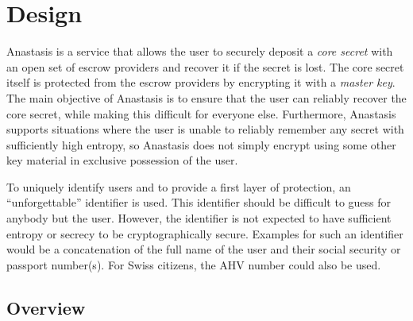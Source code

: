 \section{Design} \label{chap:design}

Anastasis is a service that allows the user to securely deposit a {\em core
secret} with an open set of escrow providers and recover it if the
secret is lost. The core secret itself is protected from the escrow
providers by encrypting it with a {\em master key}. The main objective of
Anastasis is to ensure that the user can reliably recover the core
secret, while making this difficult for everyone else. Furthermore, Anastasis
supports situations where the user is unable to reliably remember any secret
with sufficiently high entropy, so Anastasis does not simply encrypt using some
other key material in exclusive possession of the user.

To uniquely identify users and to provide a first layer of protection,
an “unforgettable” identifier is used. This identifier should be
difficult to guess for anybody but the user. However, the identifier
is not expected to have sufficient entropy or secrecy to be
cryptographically secure. Examples for such an identifier would be a
concatenation of the full name of the user and their social security
or passport number(s). For Swiss citizens, the AHV number could also
be used.

\subsection{Overview}

